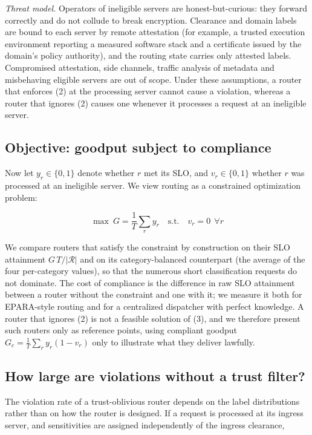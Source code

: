 \documentclass[journal]{IEEEtran}
\begin{document}
\emph{Threat model.} Operators of ineligible servers are honest-but-curious: they forward correctly and do not collude to break encryption. Clearance and domain labels are bound to each server by remote attestation \cite{coker2011} (for example, a trusted execution environment \cite{costan2016sgx} reporting a measured software stack and a certificate issued by the domain's policy authority), and the routing state carries only attested labels. Compromised attestation, side channels, traffic analysis of metadata and misbehaving eligible servers are out of scope. Under these assumptions, a router that enforces (2) at the processing server cannot cause a violation, whereas a router that ignores (2) causes one whenever it processes a request at an ineligible server.

\subsection{Objective: goodput subject to compliance}

Now let \(y_r\in\{0,1\}\) denote whether \(r\) met its SLO, and \(v_r\in\{0,1\}\) whether \(r\) was processed at an ineligible server. We view routing as a constrained optimization problem:

\begin{equation}
\max\ G=\frac{1}{T}\sum_r y_r\quad\text{s.t.}\quad v_r=0\ \ \forall r
\end{equation}

We compare routers that satisfy the constraint by construction on their SLO attainment \(G\,T/|\mathcal R|\) and on its category-balanced counterpart (the average of the four per-category values), so that the numerous short classification requests do not dominate. The cost of compliance is the difference in raw SLO attainment between a router without the constraint and one with it; we measure it both for EPARA-style routing and for a centralized dispatcher with perfect knowledge. A router that ignores (2) is not a feasible solution of (3), and we therefore present such routers only as reference points, using compliant goodput \(G_c=\frac1T\sum_r y_r(1-v_r)\) only to illustrate what they deliver lawfully.

\subsection{How large are violations without a trust filter?}

The violation rate of a trust-oblivious router depends on the label distributions rather than on how the router is designed. If a request is processed at its ingress server, and sensitivities are assigned independently of the ingress clearance,
\end{document}
